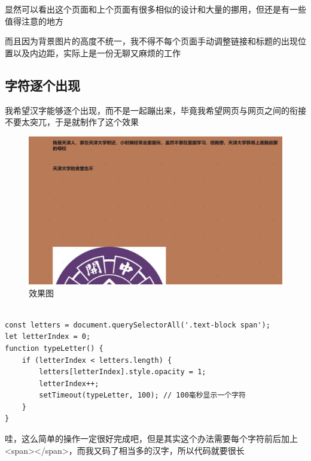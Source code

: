 \documentclass[supercite]{Experimental_Report}
\theoremstyle{definition}
\begin{document}
显然可以看出这个页面和上个页面有很多相似的设计和大量的挪用，但还是有一些值得注意的地方

而且因为背景图片的高度不统一，我不得不每个页面手动调整链接和标题的出现位置以及内边距，实际上是一份无聊又麻烦的工作
\subsection{字符逐个出现}

我希望汉字能够逐个出现，而不是一起蹦出来，毕竟我希望网页与网页之间的衔接不要太突兀，于是就制作了这个效果
\begin{figure}[htb]
	\begin{center}
		\includegraphics[scale=0.40]{images/3-2.png}
		\caption{效果图}
		\label{fig3-2}
	\end{center}
\end{figure}
\begin{verbatim}

const letters = document.querySelectorAll('.text-block span');
let letterIndex = 0;
function typeLetter() {
	if (letterIndex < letters.length) {
		letters[letterIndex].style.opacity = 1;
		letterIndex++;
		setTimeout(typeLetter, 100); // 100毫秒显示一个字符
	}
}

\end{verbatim}

哇，这么简单的操作一定很好完成吧，但是其实这个办法需要每个字符前后加上<span></span>，而我又码了相当多的汉字，所以代码就要很长
\end{document}
